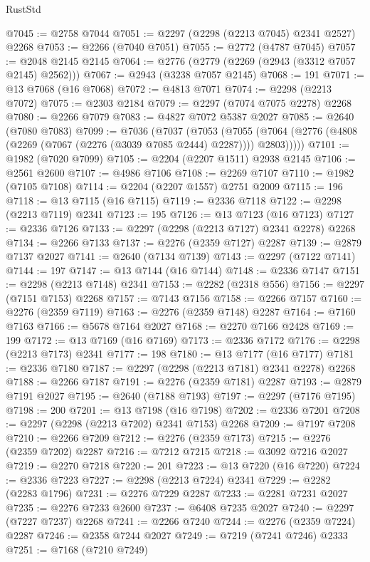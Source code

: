 \begin{lexlean}{RustStd}
\begin{coremodule}
@7045 := @2758 @7044
@7051 := @2297 (@2298 (@2213 @7045) @2341 @2527) @2268
@7053 := @2266 (@7040 @7051)
@7055 := @2772 (@4787 @7045)
@7057 := @2048 @2145 @2145
@7064 := @2776 (@2779 (@2269 (@2943 (@3312 @7057 @2145) @2562)))
@7067 := @2943 (@3238 @7057 @2145)
@7068 := 191
@7071 := @13 @7068 (@16 @7068)
@7072 := @4813 @7071
@7074 := @2298 (@2213 @7072)
@7075 := @2303 @2184
@7079 := @2297 (@7074 @7075 @2278) @2268
@7080 := @2266 @7079
@7083 := @4827 @7072 @5387 @2027
@7085 := @2640 (@7080 @7083)
@7099 := @7036
    (@7037
      (@7053
        (@7055 (@7064 (@2776 (@4808 (@2269 (@7067 (@2276 (@3039 @7085 @2444) @2287)))) @2803)))))
@7101 := @1982 (@7020 @7099)
@7105 := @2204 (@2207 @1511) @2938 @2145
@7106 := @2561 @2600
@7107 := @4986 @7106
@7108 := @2269 @7107
@7110 := @1982 (@7105 @7108)
@7114 := @2204 (@2207 @1557) @2751 @2009
@7115 := 196
@7118 := @13 @7115 (@16 @7115)
@7119 := @2336 @7118
@7122 := @2298 (@2213 @7119) @2341
@7123 := 195
@7126 := @13 @7123 (@16 @7123)
@7127 := @2336 @7126
@7133 := @2297 (@2298 (@2213 @7127) @2341 @2278) @2268
@7134 := @2266 @7133
@7137 := @2276 (@2359 @7127) @2287
@7139 := @2879 @7137 @2027
@7141 := @2640 (@7134 @7139)
@7143 := @2297 (@7122 @7141)
@7144 := 197
@7147 := @13 @7144 (@16 @7144)
@7148 := @2336 @7147
@7151 := @2298 (@2213 @7148) @2341
@7153 := @2282 (@2318 @556)
@7156 := @2297 (@7151 @7153) @2268
@7157 := @7143 @7156
@7158 := @2266 @7157
@7160 := @2276 (@2359 @7119)
@7163 := @2276 (@2359 @7148) @2287
@7164 := @7160 @7163
@7166 := @5678 @7164 @2027
@7168 := @2270 @7166 @2428
@7169 := 199
@7172 := @13 @7169 (@16 @7169)
@7173 := @2336 @7172
@7176 := @2298 (@2213 @7173) @2341
@7177 := 198
@7180 := @13 @7177 (@16 @7177)
@7181 := @2336 @7180
@7187 := @2297 (@2298 (@2213 @7181) @2341 @2278) @2268
@7188 := @2266 @7187
@7191 := @2276 (@2359 @7181) @2287
@7193 := @2879 @7191 @2027
@7195 := @2640 (@7188 @7193)
@7197 := @2297 (@7176 @7195)
@7198 := 200
@7201 := @13 @7198 (@16 @7198)
@7202 := @2336 @7201
@7208 := @2297 (@2298 (@2213 @7202) @2341 @7153) @2268
@7209 := @7197 @7208
@7210 := @2266 @7209
@7212 := @2276 (@2359 @7173)
@7215 := @2276 (@2359 @7202) @2287
@7216 := @7212 @7215
@7218 := @3092 @7216 @2027
@7219 := @2270 @7218
@7220 := 201
@7223 := @13 @7220 (@16 @7220)
@7224 := @2336 @7223
@7227 := @2298 (@2213 @7224) @2341
@7229 := @2282 (@2283 @1796)
@7231 := @2276 @7229 @2287
@7233 := @2281 @7231 @2027
@7235 := @2276 @7233 @2600
@7237 := @6408 @7235 @2027
@7240 := @2297 (@7227 @7237) @2268
@7241 := @2266 @7240
@7244 := @2276 (@2359 @7224) @2287
@7246 := @2358 @7244 @2027
@7249 := @7219 (@7241 @7246) @2333
@7251 := @7168 (@7210 @7249)

\end{coremodule}
\end{lexlean}
